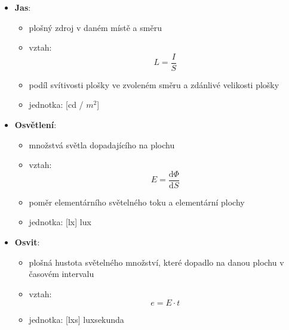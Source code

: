 \begin{itemize}
	\item \textbf{Jas}: 
	\begin{itemize}
		\item plošný zdroj v daném místě a směru
		\item vztah: \[L = \frac{I}{S}\]
		\item podíl svítivosti plošky ve zvoleném směru a zdánlivé velikosti plošky
		\item jednotka: [cd / $m^2$]
	\end{itemize}
	\newpage
	\item \textbf{Osvětlení}: 
	\begin{itemize}
		\item množstvá světla dopadajícího na plochu
		\item vztah: \[E = \frac{\mathrm{d}\Phi}{\mathrm{d}S}\]
		\item poměr elementárního světelného toku a elementární plochy
		\item jednotka: [lx] lux
	\end{itemize}
	\item \textbf{Osvit}: 
	\begin{itemize}
		\item plošná hustota světelného množství, které dopadlo na danou plochu v časovém intervalu
		\item vztah: \[e = E \cdot t\]
		\item jednotka: [lxs] luxsekunda
	\end{itemize}
\end{itemize}

